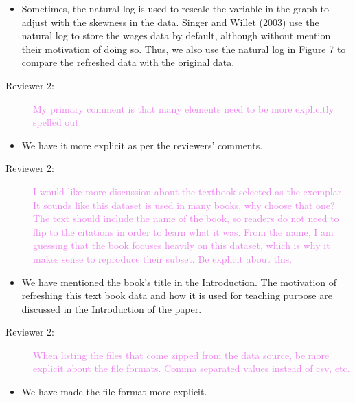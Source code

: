 \documentclass[12pt,a4paper,]{article}
\providecommand{\tightlist}{%
  \setlength{\itemsep}{0pt}\setlength{\parskip}{0pt}}
\begin{document}
\begin{itemize}
\tightlist
\item
  Sometimes, the natural log is used to rescale the variable in the graph to adjust with the skewness in the data. Singer and Willet (2003) use the natural log to store the wages data by default, although without mention their motivation of doing so. Thus, we also use the natural log in Figure 7 to compare the refreshed data with the original data.
\end{itemize}

\begin{description}
\item[Reviewer 2:]\textcolor{violet}{My primary comment is that many elements need to be more explicitly spelled out.}
\end{description}

\begin{itemize}
\tightlist
\item
  We have it more explicit as per the reviewers' comments.
\end{itemize}

\begin{description}
\item[Reviewer 2:]\textcolor{violet}{I would like more discussion about the textbook selected as the exemplar. It sounds like this dataset is used in many books, why choose that one? The text should include the name of the book, so readers do not need to flip to the citations in order to learn what it was. From the name, I am guessing that the book focuses heavily on this dataset, which is why it makes sense to reproduce their subset. Be explicit about this.}
\end{description}

\begin{itemize}
\tightlist
\item
  We have mentioned the book's title in the Introduction. The motivation of refreshing this text book data and how it is used for teaching purpose are discussed in the Introduction of the paper.
\end{itemize}

\begin{description}
\item[Reviewer 2:]\textcolor{violet}{When listing the files that come zipped from the data source, be more explicit about the file formats. Comma separated values instead of csv, etc.}
\end{description}

\begin{itemize}
\tightlist
\item
  We have made the file format more explicit.
\end{itemize}
\end{document}
